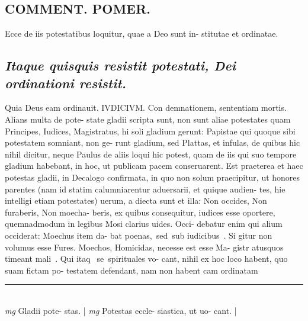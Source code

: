 \documentclass{article}
\begin{document}
\begin{pages}
\section*{COMMENT. POMER.  }\pstart Ecce de iis potestatibus loquitur, quae a Deo sunt in- stitutae et ordinatae.   \pend
{}
{}
\subsection*{\textit{Itaque quisquis resistit potestati, Dei ordinationi resistit. }}\pstart Quia Deus eam ordinauit. IVDICIVM. Con demnationem, sententiam mortis. Alians multa de pote- state gladii scripta sunt, non sunt aliae potestates quam Principes, Iudices, Magistratus, hi soli gladium gerunt: Papistae qui quoque sibi potestatem somniant, non ge- runt gladium, sed Plattas, et infulas, de quibus hic nihil dicitur, neque Paulus de aliis loqui hic potest, quam de iis qui suo tempore gladium habebant, in hoc, ut publicam pacem conseruarent. Est praeterea et haec potestas gladii, in Decalogo confirmata, in quo non solum praecipitur, ut honores parentes (nam id statim calumniarentur aduersarii, et quique audien- tes, hie intelligi etiam potestates) uerum, a diecta sunt et illa: Non occides, Non furaberis, Non moecha- beris, ex quibus consequitur, iudices esse oportere, quemnadmodum in legibus Mosi clarius uides. Occi- debatur enim qui alium occiderat: Moechus item da- bat poenas, sed sub iudicibus . Si gitur non volumus esse Fures. Moechos, Homicidas, necesse est esse Ma- gistr atusquos  timeant mali . Qui itaq se spirituales vo- cant, nihil ex hoc loco habent, quo suam fictam po- testatem defendant, nam non habent cam ordinatam  \pend
\vspace{0.5cm}\noindent
\vspace{0.2cm}\rule{1cm}{0.2pt}\\ 
\hspace{0.2cm}\textit{mg}
\footnotesize Gladii pote- stas.  
\normalsize| 
\hspace{0.2cm}\textit{mg}
\footnotesize Potestas eccle- siastica, ut uo- cant.  
\normalsize| 

\end{pages}
\end{document}
